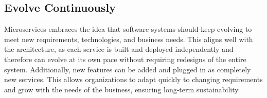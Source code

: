 \subsection{Evolve Continuously}
Microservices embraces the idea that software systems should keep evolving to meet new requirements, technologies, and business needs. This aligns well with the architecture, as each service is built and deployed independently and therefore can evolve at its own pace without requiring redesigns of the entire system. Additionally, new features can be added and plugged in as completely new services. This allows organizations to adapt quickly to changing requirements and grow with the needs of the business, ensuring long-term sustainability.